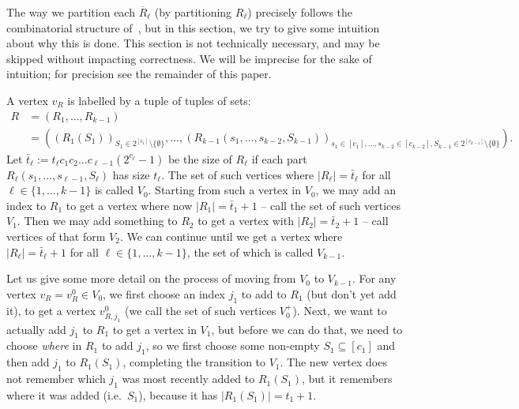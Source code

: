 \documentclass{article}
\renewcommand{\>}{\rangle}
\newcommand{\<}{\langle}
\renewcommand{\(}{\left(}
\renewcommand{\)}{\right)}
\begin{document}
The way we partition each $\overline{R}_{\ell}$ (by partitioning $R_{\ell}$) precisely follows the combinatorial structure of~\cite{belovs2012kDist}, but in this section, we try to give some intuition about why this is done. This section is not technically necessary, and may be skipped without impacting correctness. We will be imprecise for the sake of intuition; for precision see the remainder of this paper. %

\noindent A vertex $v_R$ is labelled by a tuple of tuples of sets: 
\begin{align*}
{R}&=({R}_1,\dots,{R}_{k-1}) \\
&= \left(({R}_1(S_1))_{S_1\in 2^{[c_1]}\setminus\{\emptyset\}},\dots,({R}_{k-1}(s_1,\dots,s_{k-2},S_{k-1}))_{s_1\in [c_1],\dots,s_{k-2}\in [c_{k-2}],S_{k-1}\in 2^{[c_{k-1}]}\setminus\{\emptyset\}}\right).
\end{align*}
Let $\bar{t}_{\ell}:= t_{\ell} c_1c_2\dots c_{\ell-1}(2^{c_\ell}-1)$ be the size of $R_{\ell}$ if each part $R_{\ell}(s_1,\dots,s_{\ell-1},S_{\ell})$ has size $t_{\ell}$.
The set of such vertices where $|R_{\ell}|=\bar{t}_{\ell}$ for all $\ell\in\{1,\dots,k-1\}$ is called $V_0$. 
Starting from such a vertex in $V_0$, we may add an index to $R_1$ to get a vertex where now $|R_1|=\bar{t}_1+1$ -- call the set of such vertices $V_1$. Then we may add something to $R_2$ to get a vertex with $|R_2|=\bar{t}_2+1$ -- call vertices of that form $V_2$. We can continue until we get a vertex where $|R_{\ell}|=\bar{t}_{\ell}+1$ for all $\ell\in \{1,\dots,k-1\}$, the set of which is called $V_{k-1}$. 

Let us give some more detail on the process of moving from $V_0$ to $V_{k-1}$. For any vertex $v_R=v_R^0\in V_0$, we first choose an index $j_1$ to add to $R_1$ (but don't yet add it), to get a vertex $v_{R,j_{1}}^0$ (we call the set of such vertices $V_0^+$). Next, we want to actually add $j_1$ to $R_1$ to get a vertex in $V_1$, but before we can do that, we need to choose \emph{where} in $R_1$ to add $j_1$, so we first choose some non-empty $S_1\subseteq [c_1]$ and then add $j_1$ to $R_1(S_1)$, completing the transition to $V_1$. The new vertex does not remember which $j_1$ was most recently added to $R_1(S_1)$, but it remembers where it was added (i.e.~$S_1$), because it has $|R_1(S_1)|=t_1+1$.
\end{document}

